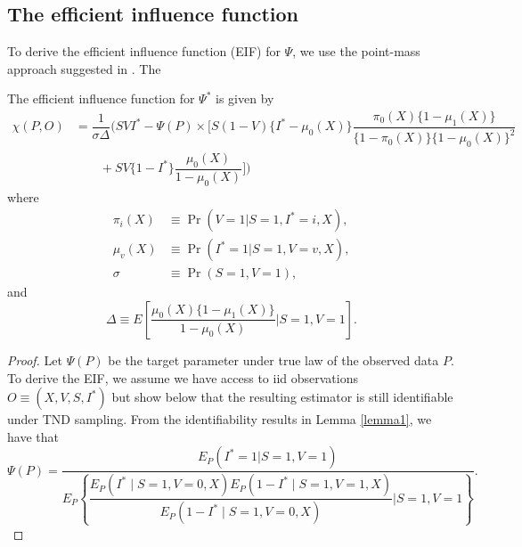 \begin{appendix}
    \subsection{The efficient influence function}
    To derive the efficient influence function (EIF) for $\Psi$, we use the point-mass approach suggested in \textcite{hines_demystifying_2022}. The 
    \begin{lemma}
        The efficient influence function for $\Psi^*$ is given by 
        \begin{align*}
         \chi(P, O) &= \dfrac{1}{\sigma \Delta} \Bigg(S V I^* - \Psi(P)  \times \bigg[S(1 - V)\{I^* - \mu_0(X)\}\dfrac{\pi_0(X)\{1 - \mu_1(X)\}}{\{1 - \pi_0(X)\}\{1 - \mu_0(X)\}^2}\\
        &\qquad + S V\{1-I^*\}\dfrac{\mu_0(X)}{1 - \mu_0(X)}\bigg] \Bigg)
    \end{align*}
    where 
    \begin{align*}
        \pi_i(X) &\equiv \Pr(V = 1 | S = 1, I^* = i, X), \\
        \mu_v(X) &\equiv \Pr(I^* = 1 | S = 1, V = v, X), \\
        \sigma &\equiv \Pr(S = 1, V = 1),
    \end{align*}
    and 
    \begin{equation*}
        \Delta \equiv E\left[\dfrac{\mu_0(X)\{1 - \mu_1(X)\}}{1 - \mu_0(X)} \bigg| S=1, V=1\right].
    \end{equation*}
    \end{lemma}

    \begin{proof}
    Let $\Psi(P)$ be the target parameter under true law of the observed data $P$. To derive the EIF, we assume we have access to iid observations $O \equiv (X, V, S, I^*)$ but show below that the resulting estimator is still identifiable under TND sampling. From the identifiability results in Lemma \ref{lemma1}, we have that 
    $$\Psi(P) = \dfrac{E_P(I^* = 1 | S = 1, V = 1)}{E_P\left\{\dfrac{E_P(I^*\mid S=1, V=0, X)E_P(1 - I^*\mid S=1, V=1, X)}{E_P(1 - I^*\mid S=1, V=0, X)} \bigg| S=1, V=1\right\}}.$$ 
    

\end{proof}
\end{appendix}
